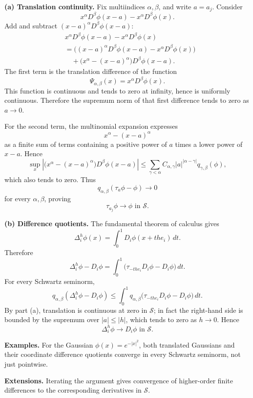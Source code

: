 \begin{solution}

\par\smallskip\noindent\textbf{(a) Translation continuity.}
Fix multiindices \(\alpha,\beta\), and write \(a=a_j\). Consider
\[
x^\alpha D^\beta\phi(x-a)-x^\alpha D^\beta\phi(x).
\]
Add and subtract \((x-a)^\alpha D^\beta\phi(x-a)\):
\[
\begin{aligned}
&x^\alpha D^\beta\phi(x-a)-x^\alpha D^\beta\phi(x)\\
&=\Big((x-a)^\alpha D^\beta\phi(x-a)-x^\alpha D^\beta\phi(x)\Big)\\
&\quad+\Big(x^\alpha-(x-a)^\alpha\Big)D^\beta\phi(x-a).
\end{aligned}
\]
The first term is the translation difference of the function
\[
\Psi_{\alpha,\beta}(x)=x^\alpha D^\beta\phi(x).
\]
This function is continuous and tends to zero at infinity, hence is uniformly
continuous. Therefore the supremum norm of that first difference tends to
zero as \(a\to0\).

For the second term, the multinomial expansion expresses
\[
x^\alpha-(x-a)^\alpha
\]
as a finite sum of terms containing a positive power of \(a\) times a lower
power of \(x-a\). Hence
\[
\sup_x
\left|
\big(x^\alpha-(x-a)^\alpha\big)D^\beta\phi(x-a)
\right|
\le
\sum_{\gamma<\alpha}
C_{\alpha,\gamma}|a|^{|\alpha-\gamma|}
q_{\gamma,\beta}(\phi),
\]
which also tends to zero. Thus
\[
q_{\alpha,\beta}(\tau_a\phi-\phi)\to0
\]
for every \(\alpha,\beta\), proving
\[
\boxed{\tau_{a_j}\phi\to\phi\text{ in }\mathcal S.}
\]

\par\smallskip\noindent\textbf{(b) Difference quotients.}
The fundamental theorem of calculus gives
\[
\Delta_i^h\phi(x)
=
\int_0^1 D_i\phi(x+the_i)\,dt.
\]
Therefore
\[
\Delta_i^h\phi-D_i\phi
=
\int_0^1
\big(\tau_{-the_i}D_i\phi-D_i\phi\big)\,dt.
\]
For every Schwartz seminorm,
\[
q_{\alpha,\beta}(\Delta_i^h\phi-D_i\phi)
\le
\int_0^1
q_{\alpha,\beta}
\big(\tau_{-the_i}D_i\phi-D_i\phi\big)\,dt.
\]
By part (a), translation is continuous at zero in \(\mathcal S\); in fact the
right-hand side is bounded by the supremum over \(|a|\le|h|\), which tends to
zero as \(h\to0\). Hence
\[
\boxed{\Delta_i^h\phi\to D_i\phi\text{ in }\mathcal S.}
\]

\medskip
\noindent\textbf{Examples.}
For the Gaussian \(\phi(x)=e^{-|x|^2}\), both translated Gaussians and their
coordinate difference quotients converge in every Schwartz seminorm, not just
pointwise.

\medskip
\noindent\textbf{Extensions.}
Iterating the argument gives convergence of higher-order finite differences
to the corresponding derivatives in \(\mathcal S\).
\end{solution}

